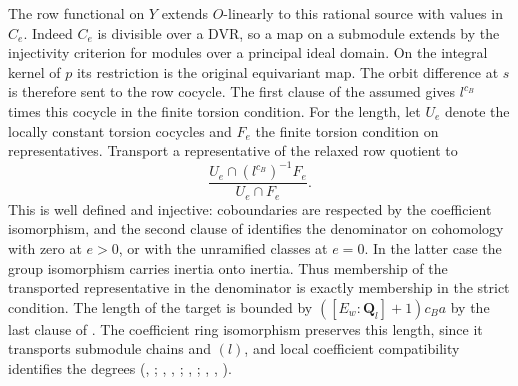 The row functional on $Y$ extends $O$-linearly to this rational source
with values in $C_e$. Indeed $C_e$ is divisible over a DVR, so a map on
a submodule extends by the injectivity criterion for modules over a
principal ideal domain. On the integral kernel of $p$ its restriction is
the original equivariant map. The orbit difference at $s$ is therefore
sent to the row cocycle. The first clause of the assumed
 gives $l^{c_B}$ times this cocycle in the finite torsion
condition. For the length, let $U_e$ denote the locally constant torsion
cocycles and $F_e$ the finite torsion condition on representatives.
Transport a representative of the relaxed row quotient to
\[
 \frac{U_e\cap (l^{c_B})^{-1}F_e}{U_e\cap F_e}.
\]
This is well defined and injective: coboundaries are respected by the
coefficient isomorphism, and the second clause of 
identifies the denominator on cohomology with zero at $e>0$, or with
the unramified classes at $e=0$. In the latter case the group
isomorphism carries inertia onto inertia. Thus membership of the
transported representative in the denominator is exactly membership in
the strict condition. The length of the target is bounded by
$( [E_w:\mathbf Q_l]+1)c_Ba$ by the last clause of .
The coefficient ring isomorphism preserves this length, since it
transports submodule chains and $(l)$, and local coefficient
compatibility identifies the degrees
(, ;
, , ;
, ;
, , ).

